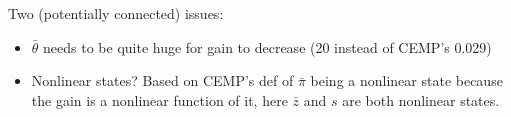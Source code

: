 \documentclass[11pt]{article}
\renewcommand{\[}{\begin{equation}}
\renewcommand{\]}{\end{equation}}
\begin{document}
Two (potentially connected) issues:
\begin{itemize}
\item $\bar{\theta}$ needs to be quite huge for gain to decrease (20 instead of CEMP's 0.029)
\item Nonlinear states? Based on CEMP's def of $\bar{\pi}$ being a nonlinear state because the gain is a nonlinear function of it, here $\bar{z}$ and $s$ are both nonlinear states.
\end{itemize}


\newpage





 
 
\end{document}
